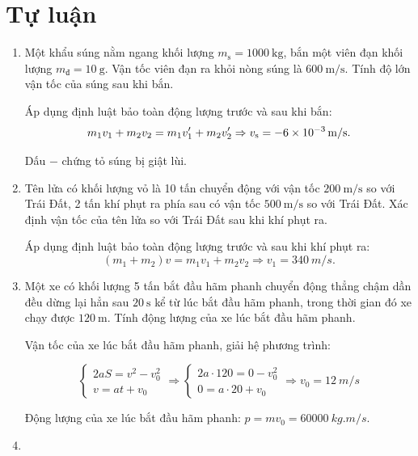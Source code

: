 \section{Tự luận}
\begin{enumerate}[label=\bfseries Câu \arabic*:]
	
	\item {}
	
	
	{
		Một khẩu súng nằm ngang khối lượng $m_\text{s}=\SI{1000}{\kilogram}$, bắn một viên đạn khối lượng $m_\text{đ}=\SI{10}{\gram}$. Vận tốc viên đạn ra khỏi nòng súng là $\SI{600}{\meter/\second}$. Tính độ lớn vận tốc của súng sau khi bắn.
	}
	
	\hideall
	{	
		Áp dụng định luật bảo toàn động lượng trước và sau khi bắn:
		$$m_1v_1 + m_2 v_2 = m_1v_1' + m_2 v_2' \Rightarrow v_\text s = \SI{-6e-3}{m/s}.$$
		
		Dấu $-$ chứng tỏ súng bị giật lùi.
	}
	\item {}
	
	
	{
		Tên lửa có khối lượng vỏ là 10 tấn chuyển động với vận tốc $\SI{200}{\meter/\second}$ so với Trái Đất, 2 tấn khí phụt ra phía sau có vận tốc $\SI{500}{\meter/\second}$ so với Trái Đất. Xác định vận tốc của tên lửa so với Trái Đất sau khi khí phụt ra.
	}
	
	\hideall
	{	
		Áp dụng định luật bảo toàn động lượng trước và sau khi khí phụt ra:
		$$(m_1+m_2)v = m_1v_1 + m_2 v_2 \Rightarrow v_1  =\SI{340}{m/s}.$$
	}
	\item {}
	
	
	{
		Một xe có khối lượng 5 tấn bắt đầu hãm phanh chuyển động thẳng chậm dần đều dừng lại hẳn sau $\SI{20}{\second}$ kể từ lúc bắt đầu hãm phanh, trong thời gian đó xe chạy được $\SI{120}{\meter}$. Tính động lượng của xe lúc bắt đầu hãm phanh.
	}
	
	\hideall
	{	
		Vận tốc của xe lúc bắt đầu hãm phanh, giải hệ phương trình:
		
		$$\begin{cases}
			2aS=v^2 - v_0^2 \\
			v=at+v_0
		\end{cases}
		\Rightarrow
		\begin{cases}
			2a\cdot 120 =0 - v_0^2 \\
			0=a\cdot 20 + v_0
		\end{cases}
		\Rightarrow v_0 = \SI{12}{m/s}
		$$
		
		Động lượng của xe lúc bắt đầu hãm phanh: $p=mv_0=\SI{60000}{kg.m/s}$.
	}
	\item {}
	

\end{enumerate}
